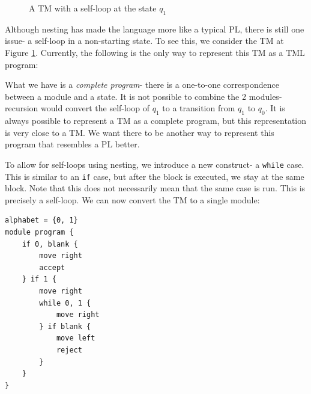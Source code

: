 \begin{figure}[htb]
    \centering
    \caption{A TM with a self-loop at the state $q_1$}
    \label{fig:self-loop-TM}
\end{figure}
Although nesting has made the language more like a typical PL, there is still one issue- a self-loop in a non-starting state. To see this, we consider the TM at Figure \ref{fig:self-loop-TM}. Currently, the following is the only way to represent this TM as a TML program:

What we have is a \emph{complete program}- there is a one-to-one correspondence between a module and a state. It is not possible to combine the 2 modules- recursion would convert the self-loop of $q_1$ to a transition from $q_1$ to $q_0$. It is always possible to represent a TM as a complete program, but this representation is very close to a TM. We want there to be another way to represent this program that resembles a PL better.

To allow for self-loops using nesting, we introduce a new construct- a \texttt{while} case. This is similar to an \texttt{if} case, but after the block is executed, we stay at the same block. Note that this does not necessarily mean that the same case is run. This is precisely a self-loop. We can now convert the TM to a single module:
\begin{lstlisting}[language=TML]
alphabet = {0, 1}
module program {
    if 0, blank {
        move right
        accept
    } if 1 {
        move right
        while 0, 1 {
            move right
        } if blank {
            move left
            reject
        }
    }
}
\end{lstlisting}

